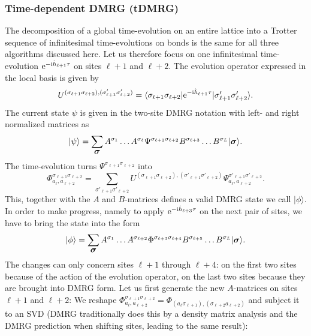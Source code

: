 \documentclass[a4paper,10pt,oneside,onecolumn,1p,times]{elsarticle}
\newcommand{\eul}{{\rm e }}
\newcommand{\imag}{{\rm i }}
\newcommand{\bra}[1]{\mbox{$\langle #1  |$}}
\newcommand{\ket}[1]{\mbox{$| #1  \rangle$}}
\newcommand{\fat}[1]{\mbox{\boldmath$#1$\unboldmath}}	%
\begin{document}
\subsubsection{Time-dependent DMRG (tDMRG)}
The decomposition of a global time-evolution on an entire lattice into a Trotter sequence of infinitesimal time-evolutions on bonds is the same for all three algorithms discussed here.
Let us therefore focus on one infinitesimal time-evolution $\eul^{-\imag  \hat{h}_{\ell+1} \tau}$ on sites $\ell+1$ and $\ell+2$. 
The evolution operator expressed in the local basis is given by
\begin{equation}
U^{(\sigma_{\ell+1} \sigma_{\ell+2}), (\sigma'_{\ell+1} \sigma'_{\ell+2})} = \bra{\sigma_{\ell+1} \sigma_{\ell+2}} \eul^{-\imag  \hat{h}_{\ell+1} \tau} \ket{\sigma'_{\ell+1} \sigma'_{\ell+2}} .
\end{equation}
The current state $\psi$ is given in the two-site DMRG notation with left- and right normalized matrices as
\begin{equation}
\ket{\psi} = \sum_{\fat{\sigma}} A^{\sigma_1} \ldots A^{\sigma_\ell} \Psi^{\sigma_{\ell+1}\sigma_{\ell+2}} B^{\sigma_{\ell+3}} \ldots B^{\sigma_L} \ket{\fat{\sigma}} .
\end{equation}
The time-evolution turns $\Psi^{\sigma_{\ell+1}\sigma_{\ell+2}}$ into
\begin{equation}
\Phi^{\sigma_{\ell+1}\sigma_{\ell+2}}_{a_\ell, a_{\ell+2}} = \sum_{\sigma'_{\ell+1} \sigma'_{\ell+2}}
U^{(\sigma_{\ell+1} \sigma_{\ell+2}), (\sigma'_{\ell+1} \sigma'_{\ell+2})}  \Psi^{\sigma'_{\ell+1}\sigma'_{\ell+2}}_{a_\ell, a_{\ell+2}} . 
\end{equation} 
This, together with the $A$ and $B$-matrices defines a valid DMRG state we call $\ket{\phi}$. In order to make progress, namely to apply $\eul^{-\imag  \hat{h}_{\ell+3} \tau}$ on the next pair of sites, we have to bring the state into the form 
\begin{equation}
\ket{\phi} = \sum_{\fat{\sigma}} A^{\sigma_1} \ldots A^{\sigma_{\ell+2}} \Phi^{\sigma_{\ell+3}\sigma_{\ell+4}} B^{\sigma_{\ell+5}} \ldots B^{\sigma_L} \ket{\fat{\sigma}} .
\end{equation}
The changes can only concern sites $\ell+1$ through $\ell+4$: on the first two sites because of the action of the evolution operator, on the last two sites because they are brought into DMRG form. Let us first generate the new $A$-matrices on sites $\ell+1$ and $\ell+2$: We reshape $\Phi^{\sigma_{\ell+1}\sigma_{\ell+2}}_{a_\ell, a_{\ell+2}} = \Phi_{(a_\ell \sigma_{\ell+1}), (\sigma_{\ell+2} a_{\ell+2})}$ and subject it to an SVD (DMRG traditionally does this by a density matrix analysis and the DMRG prediction when shifting sites, leading to the same result):
\end{document}
